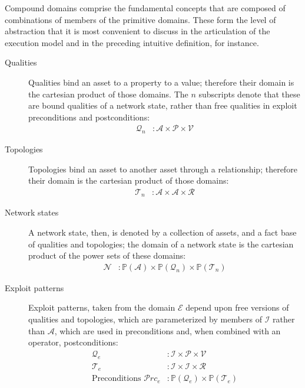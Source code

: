 Compound domains comprise the fundamental concepts that are composed of combinations
of members of the primitive domains. These form the level of abstraction that it is
most convenient to discuss in the articulation of the execution model and in the
preceding intuitive definition, for instance.
\begin{description}
    \item[Qualities] Qualities bind an asset to a property to a value; therefore their
        domain is the cartesian product of those domains. The $n$ subscripts denote that
        these are bound qualities of a network state, rather than free qualities in
        exploit preconditions and postconditions:
        \begin{align*}
            \mathcal{Q}_n &: \mathcal{A} \times \mathcal{P} \times \mathcal{V}
        \end{align*}
    \item[Topologies] Topologies bind an asset to another asset through a relationship; therefore their
        domain is the cartesian product of those domains:
        \begin{align*}
            \mathcal{T}_n&: \mathcal{A} \times \mathcal{A} \times \mathcal{R}
        \end{align*}
    \item[Network states] A network state, then, is denoted by a collection of assets, and a fact base
        of qualities and topologies; the domain of a network state is the cartesian product
        of the power sets of these domains:
        \begin{align*}
            \mathcal{N}&: \mathbb{P}(\mathcal{A}) \times \mathbb{P}(\mathcal{Q}_n) \times \mathbb{P}(\mathcal{T}_n)
        \end{align*}
    \item[Exploit patterns] Exploit patterns, taken from the domain $\mathcal{E}$ 
		depend upon free versions of qualities and topologies,
		which are parameterized by members of $\mathcal{I}$ rather than $\mathcal{A}$, which are used in
		preconditions and, when combined with an operator, postconditions:
        \begin{align*}
			\mathcal{Q}_e&: \mathcal{I} \times \mathcal{P} \times \mathcal{V} \\
			\mathcal{T}_e&: \mathcal{I} \times \mathcal{I} \times \mathcal{R} \\
			\text{Preconditions } \mathcal{P}rc_e &: \mathbb{P}(\mathcal{Q}_e) \times \mathbb{P}(\mathcal{T}_e) \\

\end{align*}
\end{description}
